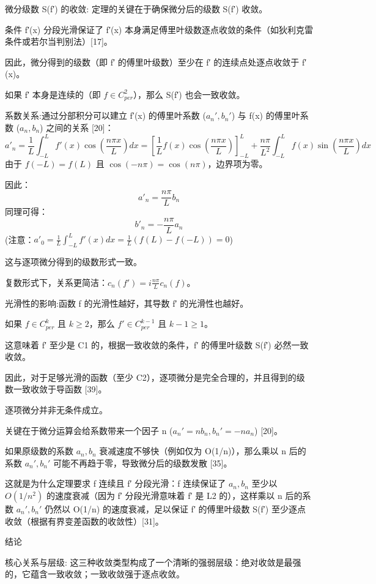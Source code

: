 微分级数 S(f′) 的收敛: 定理的关键在于确保微分后的级数 S(f′) 收敛。

条件 f′(x) 分段光滑保证了 f′(x) 本身满足傅里叶级数逐点收敛的条件（如狄利克雷条件或若尔当判别法）[17]。

因此，微分得到的级数（即 f′ 的傅里叶级数）至少在 f′ 的连续点处逐点收敛于 f′(x)。

如果 f′ 本身是连续的（即 $f\in C_{per}^2$），那么 S(f′) 也会一致收敛。

系数关系:通过分部积分可以建立 f′(x) 的傅里叶系数 ($a_n',b_n'$) 与 f(x) 的傅里叶系数 ($a_n,b_n$) 之间的关系 [20]：
\[
a'_n = \frac{1}{L} \int_{-L}^{L} f'(x) \cos\left(\frac{n\pi x}{L}\right) dx = \left[\frac{1}{L} f(x) \cos\left(\frac{n\pi x}{L}\right)\right]_{-L}^{L} + \frac{n\pi}{L^2} \int_{-L}^{L} f(x) \sin\left(\frac{n\pi x}{L}\right) dx
\]
由于 $f(−L)=f(L)$ 且 $\cos(−n\pi)=\cos(n\pi)$，边界项为零。

因此：
\[
a'_n=\frac{n\pi}{L}b_n
\]
同理可得：
\[
b'_n=-\frac{n\pi}{L}a_n
\]
(注意：$a'_0=\frac{1}{L}\int_{-L}^{L}f'(x)dx=\frac{1}{L}(f(L)−f(−L))=0$)

这与逐项微分得到的级数形式一致。

复数形式下，关系更简洁：$c_n(f')=i\frac{n\pi}{L}c_n(f)$。

光滑性的影响:函数 f 的光滑性越好，其导数 f′ 的光滑性也越好。

如果 $f\in C_{per}^k$ 且 $k\geq 2$，那么 $f'\in C_{per}^{k−1}$ 且 $k−1\geq 1$。

这意味着 f′ 至少是 C1 的，根据一致收敛的条件，f′ 的傅里叶级数 S(f′) 必然一致收敛。

因此，对于足够光滑的函数（至少 C2），逐项微分是完全合理的，并且得到的级数一致收敛于导函数 [39]。

逐项微分并非无条件成立。

关键在于微分运算会给系数带来一个因子 n ($a_n'=nb_n, b_n'=-na_n$) [20]。

如果原级数的系数 $a_n,b_n$ 衰减速度不够快（例如仅为 O(1/n)），那么乘以 n 后的系数 $a_n',b_n'$ 可能不再趋于零，导致微分后的级数发散 [35]。

这就是为什么定理要求 f 连续且 f′ 分段光滑：f 连续保证了 $a_n,b_n$ 至少以 $O(1/n^2)$ 的速度衰减（因为 f′ 分段光滑意味着 f′ 是 L2 的），这样乘以 n 后的系数 $a_n',b_n'$ 仍然以 O(1/n) 的速度衰减，足以保证 f′ 的傅里叶级数 S(f′) 至少逐点收敛（根据有界变差函数的收敛性）[31]。

结论

核心关系与层级: 这三种收敛类型构成了一个清晰的强弱层级：绝对收敛是最强的，它蕴含一致收敛；一致收敛强于逐点收敛。

